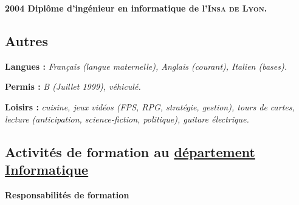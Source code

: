 \documentclass[12pt,a4paper]{article}
\newcommand{\activite}[1]{\textbf{#1}\xspace}
\newcommand{\comment}[1]{\textsl{#1}\xspace}
\newcommand{\INSAL}{\textsc{Insa de Lyon}\xspace}
\begin{document}
    \activite{2004 Diplôme d'ingénieur en informatique de l'\INSAL.}

\subsection*{Autres}

  \activite{Langues :}
  \comment{Français (langue maternelle), Anglais (courant), Italien (bases).}

  \activite{Permis :}
  \comment{B (Juillet 1999), véhiculé.}

  \activite{Loisirs :}
  \comment{cuisine, jeux vidéos (FPS, RPG, stratégie, gestion), tours de cartes, lecture (anticipation, science-fiction, politique), guitare électrique.}

\clearpage

\subsection*{Activités de formation au \href{https://fst-informatique.univ-lyon1.fr/}{département Informatique}}

\activite{Responsabilités de formation}
\end{document}
